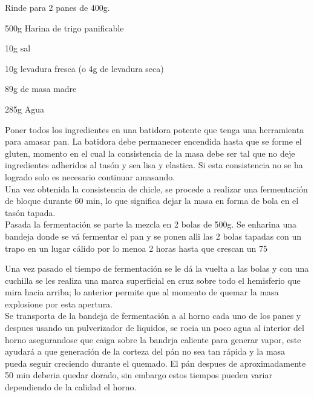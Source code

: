 
Rinde para 2 panes de 400g.

\begin{ingredientes}
\item 500g Harina de trigo panificable
\item 10g sal
\item 10g levadura fresca (o 4g de levadura seca)
\item 89g de masa madre
\item 285g Agua
\end{ingredientes}
\preparacion
Poner todos los ingredientes en una batidora potente que tenga una herramienta para amasar pan. La batidora debe permanecer encendida hasta que se forme el gluten, momento en el cual la consistencia de la masa debe ser tal que no deje ingredientes adheridos al tasón y sea lisa y elastica. Si esta consistencia no se ha logrado solo es necesario continuar amasando.\\

Una vez obtenida la consistencia de chicle, se procede a realizar una fermentación de bloque durante 60 min, lo que significa dejar la masa en forma de bola en el tasón tapada.\\

Pasada la fermentación se parte la mezcla en 2 bolas de 500g. Se enharina una bandeja donde se vá fermentar el pan y se ponen alli las 2 bolas tapadas con un trapo en un lugar cálido por lo menoa 2 horas hasta que crescan un 75%


Una vez pasado el tiempo de fermentación se le dá la vuelta a las bolas y con una cuchilla se les realiza una marca superficial en cruz sobre todo el hemisferio que mira hacia arriba; lo anterior permite que al momento de quemar la masa explosione por esta apertura.\\

Se transporta de la bandeja de fermentación a al horno cada uno de los  panes y despues usando un pulverizador de liquidos, se rocia un poco agua al interior del horno asegurandose que caiga sobre la bandrja caliente para generar vapor, este ayudará a que generación de la corteza del pán no sea tan rápida y la masa pueda seguir creciendo durante el quemado. El pán despues de aproximadamente 50 min deberia quedar dorado, sin embargo estos tiempos pueden variar dependiendo de la calidad el horno.\\

